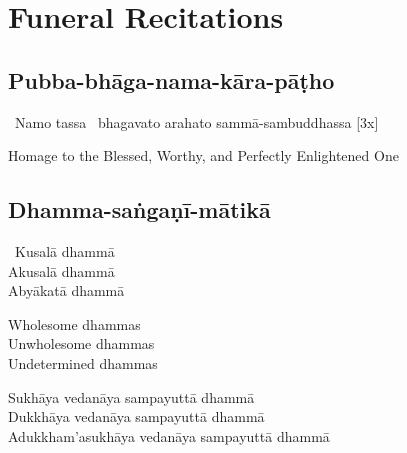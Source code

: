 
\ifdesktopversion
\else
\fi

\chapter{Funeral Recitations}

\clearpage



\section{Pubba-bhāga-nama-kāra-pāṭho}
\label{pubba-bhaga-nama-kara-patho-funeral}


\begin{pali-hangtogether}
  \anglebracketleft\ \hspace{-0.5mm}Namo tassa \hspace{-0.5mm}\anglebracketright\ bhagavato arahato sammā-sambuddhassa \hfill{[3x]}
\end{pali-hangtogether}

\begin{english}
  Homage to the Blessed, Worthy, and Perfectly Enlightened One
\end{english}

\suttaRef{[DN 21]}



\section{Dhamma-saṅgaṇī-mātikā}
\label{dhamma-sangani-matika}

\begin{pali-hangtogether}
  \anglebracketleft\ \hspace{-0.5mm}Kusalā dhammā \hspace{-0.5mm}\anglebracketright\ \\
  Akusalā dhammā\\
  Abyākatā dhammā
\end{pali-hangtogether}

\begin{english-verses}
  Wholesome dhammas\\
  Unwholesome dhammas\\
  Undetermined dhammas
\end{english-verses}

\begin{pali-hang-continued}
  Sukhāya vedanāya sampayuttā dhammā\\
  Dukkhāya vedanāya sampayuttā dhammā\\
  Adukkham'asukhāya vedanāya sampayuttā dhammā
\end{pali-hang-continued}


